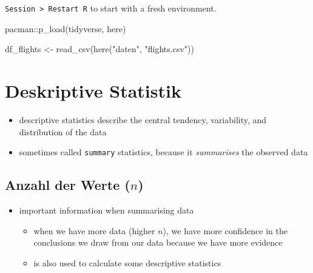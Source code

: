 \documentclass[
  letterpaper,
  DIV=11]{scrartcl}
\newenvironment{Shaded}{\begin{snugshade}}{\end{snugshade}}
\newcommand{\FunctionTok}[1]{\textcolor[rgb]{0.28,0.35,0.67}{#1}}
\newcommand{\NormalTok}[1]{\textcolor[rgb]{0.00,0.23,0.31}{#1}}
\newcommand{\OtherTok}[1]{\textcolor[rgb]{0.00,0.23,0.31}{#1}}
\newcommand{\SpecialCharTok}[1]{\textcolor[rgb]{0.37,0.37,0.37}{#1}}
\newcommand{\StringTok}[1]{\textcolor[rgb]{0.13,0.47,0.30}{#1}}
\providecommand{\tightlist}{%
  \setlength{\itemsep}{0pt}\setlength{\parskip}{0pt}}\usepackage{longtable,booktabs,array}
\begin{document}
\texttt{Session\ \textgreater{}\ Restart\ R} to start with a fresh
environment.

\begin{Shaded}
\begin{Highlighting}[]
\NormalTok{pacman}\SpecialCharTok{::}\FunctionTok{p\_load}\NormalTok{(tidyverse,}
\NormalTok{               here)}
\end{Highlighting}
\end{Shaded}

\begin{Shaded}
\begin{Highlighting}[]
\NormalTok{df\_flights }\OtherTok{\textless{}{-}} \FunctionTok{read\_csv}\NormalTok{(}\FunctionTok{here}\NormalTok{(}\StringTok{"daten"}\NormalTok{, }\StringTok{"flights.csv"}\NormalTok{))}
\end{Highlighting}
\end{Shaded}

\hypertarget{deskriptive-statistik}{%
\section{Deskriptive Statistik}\label{deskriptive-statistik}}

\begin{itemize}
\item
  descriptive statistics describe the central tendency, variability, and
  distribution of the data
\item
  sometimes called \texttt{summary} statistics, because it
  \emph{summarises} the observed data
\end{itemize}

\hypertarget{anzahl-der-werte-n}{%
\subsection{\texorpdfstring{Anzahl der Werte
(\(n\))}{Anzahl der Werte (n)}}\label{anzahl-der-werte-n}}

\begin{itemize}
\tightlist
\item
  important information when summarising data

  \begin{itemize}
  \tightlist
  \item
    when we have more data (higher \(n\)), we have more confidence in
    the conclusions we draw from our data because we have more evidence
  \item
    is also used to calculate some descriptive statistics
  \end{itemize}
\end{itemize}
\end{document}
